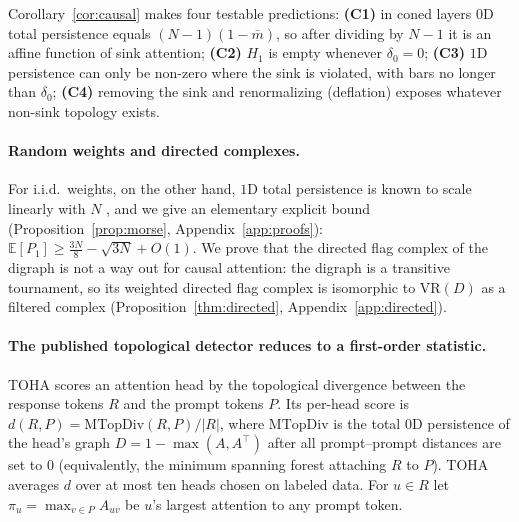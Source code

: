 \documentclass{article}
\theoremstyle{definition}
\newcommand{\VR}{\mathrm{VR}}
\newcommand{\defect}{\delta}
\begin{document}
Corollary~\ref{cor:causal} makes four testable predictions: \textbf{(C1)} in coned layers $0$D total persistence equals $(N{-}1)(1-\bar m)$, so after dividing by $N-1$ it is an affine function of sink attention; \textbf{(C2)} $H_1$ is empty whenever $\defect_0=0$; \textbf{(C3)} $1$D persistence can only be non-zero where the sink is violated, with bars no longer than $\defect_0$; \textbf{(C4)} removing the sink and renormalizing (deflation) exposes whatever non-sink topology exists.

\paragraph{Random weights and directed complexes.} For i.i.d.\ weights, on the other hand, $1$D total persistence is known to scale linearly with $N$ \citep{hiraoka2017msa,hino2019lifetime}, and we give an elementary explicit bound (Proposition~\ref{prop:morse}, Appendix~\ref{app:proofs}): $\mathbb{E}[P_1]\ge\tfrac{3N}{8}-\sqrt{3N}+O(1)$. We prove that the directed flag complex of the digraph is not a way out for causal attention: the digraph is a transitive tournament, so its weighted directed flag complex is isomorphic to $\VR(D)$ as a filtered complex (Proposition~\ref{thm:directed}, Appendix~\ref{app:directed}).

\paragraph{The published topological detector reduces to a first-order statistic.} TOHA \citep{toha} scores an attention head by the topological divergence between the response tokens $R$ and the prompt tokens $P$. Its per-head score is $d(R,P)=\mathrm{MTopDiv}(R,P)/|R|$, where $\mathrm{MTopDiv}$ is the total $0$D persistence of the head's graph $D=1-\max(A,A^\top)$ after all prompt--prompt distances are set to $0$ (equivalently, the minimum spanning forest attaching $R$ to $P$). TOHA averages $d$ over at most ten heads chosen on labeled data. For $u\in R$ let $\pi_u=\max_{v\in P}A_{uv}$ be $u$'s largest attention to any prompt token.
\end{document}
